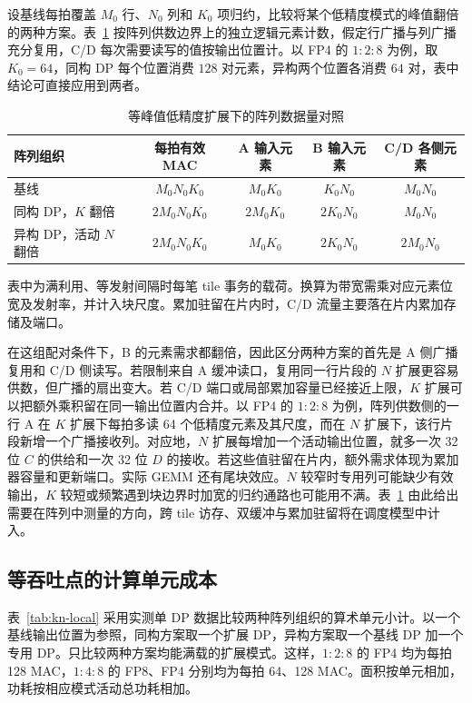 \documentclass[10.5pt,compsoc,UTF8]{CjC}
\newcommand{\ratio}[3]{\ensuremath{#1\!:\!#2\!:\!#3}}
\newcommand{\tabnote}[1]{\par\smallskip\begin{minipage}{\linewidth}\zihao{5-}#1\end{minipage}}
\begin{document}
设基线每拍覆盖 $M_0$ 行、$N_0$ 列和 $K_0$ 项归约，比较将某个低精度模式的峰值翻倍的两种方案。表~\ref{tab:array-traffic} 按阵列供数边界上的独立逻辑元素计数，假定行广播与列广播充分复用，C/D 每次需要读写的值按输出位置计。以 FP4 的 \ratio{1}{2}{8} 为例，取 $K_0=64$，同构 DP 每个位置消费 $128$ 对元素，异构两个位置各消费 $64$ 对，表中结论可直接应用到两者。

\begin{table}[htbp]
\centering
\caption{等峰值低精度扩展下的阵列数据量对照}
\label{tab:array-traffic}
\begin{tabular*}{0.94\linewidth}{@{\extracolsep{\fill}}lcccc@{}}
\toprule
阵列组织 & 每拍有效 MAC & A 输入元素 & B 输入元素 & C/D 各侧元素 \\
\midrule
基线 & $M_0N_0K_0$ & $M_0K_0$ & $K_0N_0$ & $M_0N_0$ \\
同构 DP，$K$ 翻倍 & $2M_0N_0K_0$ & $2M_0K_0$ & $2K_0N_0$ & $M_0N_0$ \\
异构 DP，活动 $N$ 翻倍 & $2M_0N_0K_0$ & $M_0K_0$ & $2K_0N_0$ & $2M_0N_0$ \\
\bottomrule
\end{tabular*}
\tabnote{表中为满利用、等发射间隔时每笔 tile 事务的载荷。换算为带宽需乘对应元素位宽及发射率，并计入块尺度。累加驻留在片内时，C/D 流量主要落在片内累加存储及端口。}
\end{table}

在这组配对条件下，B 的元素需求都翻倍，因此区分两种方案的首先是 A 侧广播复用和 C/D 侧读写。若限制来自 A 缓冲读口，复用同一行片段的 $N$ 扩展更容易供数，但广播的扇出变大。若 C/D 端口或局部累加容量已经接近上限，$K$ 扩展可以把额外乘积留在同一输出位置内合并。以 FP4 的 \ratio{1}{2}{8} 为例，阵列供数侧的一行 A 在 $K$ 扩展下每拍多读 64 个低精度元素及其尺度，而在 $N$ 扩展下，该行片段新增一个广播接收列。对应地，$N$ 扩展每增加一个活动输出位置，就多一次 32 位 $C$ 的供给和一次 32 位 $D$ 的接收。若这些值驻留在片内，额外需求体现为累加器容量和更新端口。实际 GEMM 还有尾块效应。$N$ 较窄时专用列可能缺少有效输出，$K$ 较短或频繁遇到块边界时加宽的归约通路也可能用不满。表~\ref{tab:array-traffic} 由此给出需要在阵列中测量的方向，跨 tile 访存、双缓冲与累加驻留将在调度模型中计入。

\subsection{等吞吐点的计算单元成本}

表~\ref{tab:kn-local} 采用实测单 DP 数据比较两种阵列组织的算术单元小计。以一个基线输出位置为参照，同构方案取一个扩展 DP，异构方案取一个基线 DP 加一个专用 DP。只比较两种方案均能满载的扩展模式。这样，\ratio{1}{2}{8} 的 FP4 均为每拍 128 MAC，\ratio{1}{4}{8} 的 FP8、FP4 分别均为每拍 64、128 MAC。面积按单元相加，功耗按相应模式活动总功耗相加。
\end{document}
